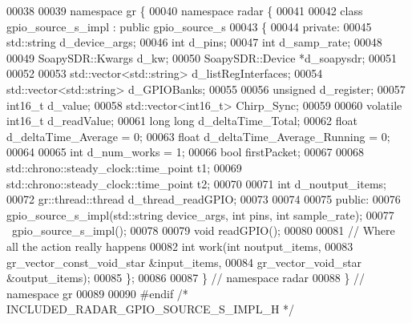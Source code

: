 \begin{DoxyCode}
00038 
00039 \textcolor{keyword}{namespace }gr \{
00040   \textcolor{keyword}{namespace }radar \{
00041 
00042     \textcolor{keyword}{class }gpio_source_s_impl : \textcolor{keyword}{public} gpio_source_s
00043     \{
00044      \textcolor{keyword}{private}:
00045        std::string d_device_args;
00046        \textcolor{keywordtype}{int} d_pins;
00047        \textcolor{keywordtype}{int} d_samp_rate;
00048 
00049        SoapySDR::Kwargs d_kw;
00050        SoapySDR::Device *d_soapysdr;
00051 
00052 
00053        std::vector<std::string> d_listRegInterfaces;
00054        std::vector<std::string> d_GPIOBanks;
00055 
00056        \textcolor{keywordtype}{unsigned} d_register;
00057        int16\_t  d_value;
00058        std::vector<int16\_t> Chirp_Sync;
00059 
00060        \textcolor{keyword}{volatile} int16\_t d_readValue;
00061        \textcolor{keywordtype}{long} \textcolor{keywordtype}{long} d_deltaTime_Total;
00062        \textcolor{keywordtype}{float} d_deltaTime_Average = 0;
00063        \textcolor{keywordtype}{float} d_deltaTime_Average_Running = 0;
00064 
00065        \textcolor{keywordtype}{int} d_num_works = 1;
00066        \textcolor{keywordtype}{bool} firstPacket;
00067 
00068        std::chrono::steady\_clock::time\_point t1;
00069        std::chrono::steady\_clock::time\_point t2;
00070 
00071        \textcolor{keywordtype}{int} d_noutput_items;
00072        gr::thread::thread d_thread_readGPIO;
00073 
00074 
00075      \textcolor{keyword}{public}:
00076       gpio_source_s_impl(std::string device\_args, \textcolor{keywordtype}{int} pins, \textcolor{keywordtype}{int} sample\_rate);
00077       ~gpio_source_s_impl();
00078 
00079       \textcolor{keywordtype}{void} readGPIO();
00080 
00081       \textcolor{comment}{// Where all the action really happens}
00082       \textcolor{keywordtype}{int} work(\textcolor{keywordtype}{int} noutput\_items,
00083          gr\_vector\_const\_void\_star &input\_items,
00084          gr\_vector\_void\_star &output\_items);
00085     \};
00086 
00087   \} \textcolor{comment}{// namespace radar}
00088 \} \textcolor{comment}{// namespace gr}
00089 
00090 \textcolor{preprocessor}{#endif }\textcolor{comment}{/* INCLUDED\_RADAR\_GPIO\_SOURCE\_S\_IMPL\_H */}\textcolor{preprocessor}{}
\end{DoxyCode}

